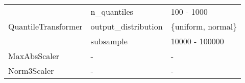 \begin{table*}
\begin{tabular}{@{}l>{\ttfamily}lp{}@{}}
\multirow{3}{*}{QuantileTransformer} & n\_quantiles                      & 100 - 1000                               \\ \cmidrule{2-3}
                                     & output\_distribution              & \{uniform, normal\}                      \\ \cmidrule{2-3}
                                     & subsample                         & 10000 - 100000                           \\ \midrule
MaxAbsScaler                         & -                                 & -                                        \\ \midrule
Norm3Scaler                          & -                                 & -                                        \\ \midrule
\end{tabular}
\label{tab:optuna_preprocessing_configurations}
\end{table*}


